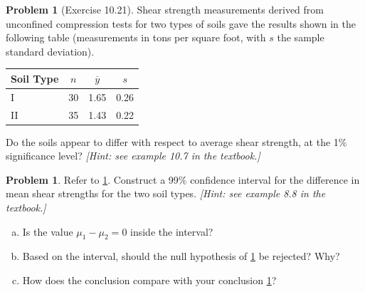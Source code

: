 \documentclass[10pt]{article}
\theoremstyle{definition}
\newtheorem{problem}[theorem]{Problem}
\newcommand{\1}[1]{\textbf{1}_{\left[#1\right]}} %
\begin{document}
\begin{problem}[Exercise 10.21]
  \label{problem:exercise-10.21}
  Shear strength measurements derived from unconﬁned compression tests for two
  types of soils gave the results shown in the following table (measurements
  in tons per square foot, with $s$ the sample standard deviation).
  \begin{center}
    \begin{tabular}{lccc}
      \hline
      \textbf{Soil Type} & \boldmath$n$ & \boldmath$\overline{y}$ & \boldmath$s$ \\
      \hline
      I   & 30 & 1.65 & 0.26 \\
      II  & 35 & 1.43 & 0.22 \\
      \hline
    \end{tabular}
  \end{center}
  Do the soils appear to differ with respect to average shear strength, at the
  1\% signiﬁcance level? \textit{[Hint: see example 10.7 in the textbook.]}
  
\end{problem}

\begin{problem}
  Refer to \cref{problem:exercise-10.21}. Construct a 99\% confidence interval
  for the difference in mean shear strengths for the two soil types.
  \textit{[Hint: see example 8.8 in the textbook.]}
  \begin{enumerate}[(a)]
    \item Is the value $\mu_{1}-\mu_{2}=0$ inside the interval?
    \item Based on the interval, should the null hypothesis of
    \cref{problem:exercise-10.21} be rejected? Why?
    \item How does the conclusion compare with your conclusion
    \cref{problem:exercise-10.21}?
  \end{enumerate}
\end{problem}
\end{document}
